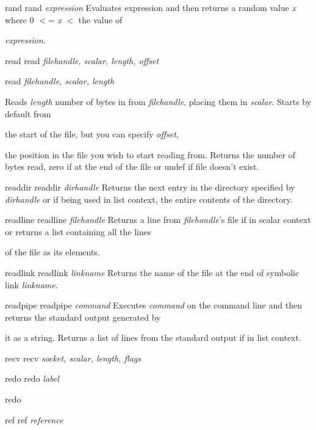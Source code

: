 \documentclass[a4paper,11pt]{book}
\begin{document}
\noindent rand rand \textit{expression }Evaluates expression and then returns a random value \textit{x }where 0 $<$= \textit{x }$<$ the value of

\noindent \textit{expression}.

\noindent 

\noindent read read \textit{filehandle, scalar, length, offset}

\noindent 

\noindent read \textit{filehandle, scalar, length}

\noindent 

\noindent Reads \textit{length }number of bytes in from \textit{filehandle}, placing them in \textit{scalar}. Starts by default from

\noindent the start of the file, but you can specify \textit{offset},

\noindent the position in the file you wish to start reading from. Returns the number of bytes read, zero if at the end of the file or undef if file doesn't exist.

\noindent readdir readdir \textit{dirhandle }Returns the next entry in the directory specified by \textit{dirhandle }or if being used in list context, the entire contents of the directory.

\noindent readline readline \textit{filehandle }Returns a line from \textit{filehandle}'s file if in scalar context or returns a list containing all the lines

\noindent of the file as its elements.

\noindent 

\noindent readlink readlink \textit{linkname }Returns the name of the file at the end of symbolic link \textit{linkname}.

\noindent readpipe readpipe \textit{command }Executes \textit{command }on the command line and then returns the standard output generated by

\noindent it as a string. Returns a list of lines from the standard output if in list context.

\noindent recv recv \textit{socket, scalar, length, flags}

\noindent 

\noindent redo redo \textit{label}

\noindent redo

\noindent 

\noindent 

\noindent 

\noindent ref ref \textit{reference}
\end{document}
